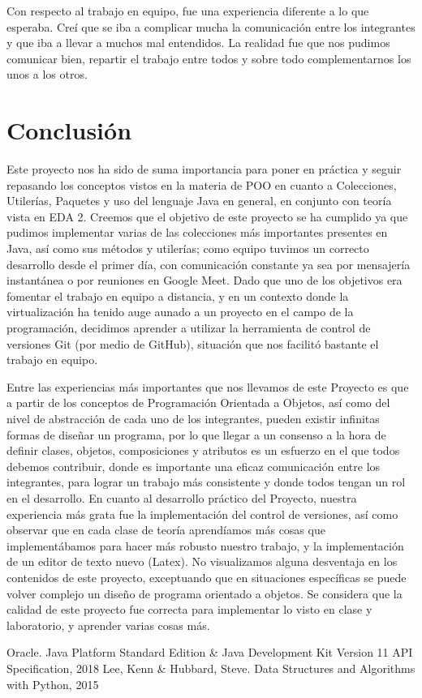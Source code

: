 \documentclass[11pt]{article}
\begin{document}
\par

Con respecto al trabajo en equipo, fue una experiencia diferente a lo 
que esperaba. Creí que se iba a complicar mucha la comunicación entre 
los integrantes y que iba a llevar a muchos mal entendidos. La 
realidad fue que nos pudimos comunicar bien, repartir el trabajo 
entre todos y sobre todo complementarnos los unos a los otros. 



\section{Conclusión}
\par

Este proyecto nos ha sido de suma importancia para poner en práctica y seguir repasando los conceptos vistos en la materia de POO en cuanto a Colecciones, Utilerías, Paquetes y uso del lenguaje Java en general, en conjunto con teoría vista en EDA 2. Creemos que el objetivo de este proyecto se ha cumplido ya que pudimos implementar varias de las colecciones más importantes presentes en Java, así como sus métodos y utilerías; como equipo tuvimos un correcto desarrollo desde el primer día, con comunicación constante ya sea por mensajería instantánea o por reuniones en Google Meet. Dado que uno de los objetivos era fomentar el trabajo en equipo a distancia, y en un contexto donde la virtualización ha tenido auge aunado a un proyecto en el campo de la programación, decidimos aprender a utilizar la herramienta de control de versiones Git (por medio de GitHub), situación que nos facilitó bastante el trabajo en equipo.
\par
Entre las experiencias más importantes que nos llevamos de este Proyecto es que a partir de los conceptos de Programación Orientada a Objetos, así como del nivel de abstracción de cada uno de los integrantes, pueden existir infinitas formas de diseñar un programa, por lo que llegar a un consenso a la hora de definir clases, objetos, composiciones y atributos es un esfuerzo en el que todos debemos contribuir, donde es importante una eficaz comunicación entre los integrantes, para lograr un trabajo más consistente y donde todos tengan un rol en el desarrollo. En cuanto al desarrollo práctico del Proyecto, nuestra experiencia más grata fue la implementación del control de versiones, así como observar que en cada clase de teoría aprendíamos más cosas que implementábamos para hacer más robusto nuestro trabajo, y la implementación de un editor de texto nuevo (Latex). No visualizamos alguna desventaja en los contenidos de este proyecto, exceptuando que en situaciones específicas se puede volver complejo un diseño de programa orientado a objetos. Se considera que la calidad de este proyecto fue correcta para implementar lo visto en clase y laboratorio, y aprender varias cosas más.

\begin{thebibliography}{0}
 Oracle. Java Platform Standard Edition \& Java Development Kit
Version 11 API Specification, 2018
 Lee, Kenn \& Hubbard, Steve. Data Structures and Algorithms with Python, 2015
\end{thebibliography}
\end{document}
